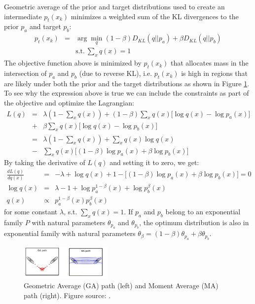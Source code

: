 Geometric average of the prior and target distributions used to create an intermediate $p_t(x_k)$ minimizes a weighted sum of the KL divergences to the prior $p_a$ and target $p_b$:
\begin{eqnarray}
    p_t(x_k) &=& \arg \min_q (1-\beta)D_{KL}(q||p_a) + \beta D_{KL}(q||p_b) \\
    && \mathrm{s.t.}~\sum_x q(x) = 1
\end{eqnarray}
The objective function above is minimized by $p_t(x_k)$ that allocates mass in the intersection of $p_a$ and $p_b$ (due to reverse KL), i.e. $p_t(x_k)$ is high in regions that are likely under both the prior and the target distributions as shown in Figure \ref{fig:ga_ma_path}. To see why the expression above is true we can include the constraints as part of the objective and optimize the Lagrangian:
\begin{eqnarray}
    L(q) &=& \lambda(1-\sum_x q(x)) + (1-\beta)\sum_x q(x)\big[\log q(x) - \log p_a(x)\big] \nonumber \\
         &+& \beta\sum_x q(x) \big[\log q(x) - \log p_b(x)\big] \\
         &=& \lambda(1-\sum_x q(x)) + \sum_x q(x) \log q(x) \nonumber \\
         &-& \sum_x q(x)\big[(1-\beta)\log p_a(x) + \beta \log p_b(x)\big]
\end{eqnarray}
By taking the derivative of $L(q)$ and setting it to zero, we get:
\begin{eqnarray}
    \frac{d L(q)}{d q(x)} &=& -\lambda + \log q(x) + 1 - \big[(1-\beta)\log p_a(x) + \beta \log p_b(x)\big] = 0 \\
    \log q(x) &=& \lambda - 1 + \log p_{a}^{1-\beta}(x) + \log p_{b}^{\beta}(x) \\
    q(x) &\propto& p_{a}^{1-\beta}(x)p_{b}^{\beta}(x)
\end{eqnarray}
for some constant $\lambda$, s.t. $\sum_x q(x) = 1$. If $p_a$ and $p_b$ belong to an exponential family $P$ with natural parameters $\theta_{p_a}$ and $\theta_{p_b}$, the optimum distribution is also in exponential family with natural parameters $\theta_{\beta} = (1-\beta)\theta_{p_a} + \beta\theta_{p_b}$.\\

\begin{figure}[thpb]
    \centering
    \includegraphics[width=0.4\textwidth, trim={10 10 10 10}]{figures/ga_ma_path.png}
    \caption{Geometric Average (GA) path (left) and Moment Average (MA) path (right). Figure source: \cite{Grosse2013}.}
    \label{fig:ga_ma_path}
\end{figure}

